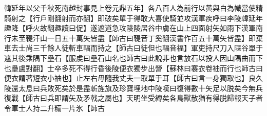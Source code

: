 韓延年以父千秋死南越封事見上卷元鼎五年】各八百人為前行以黄與白為幟當使精騎射之【行戶剛翻射而亦翻】即破矣單于得敢大喜使騎並攻漢軍疾呼曰李陵韓延年趣降【呼火故翻趣讀曰促】遂遮道急攻陵陵居谷中虜在山上四面射矢如雨下漢軍南行未至鞮汗山一日五十萬矢皆盡【師古曰鞮音丁奚翻漢書作百五十萬矢皆盡】即棄車去士尚三千餘人徒斬車輻而持之【師古曰徒但也輻音福】軍吏持尺刀入陿谷單于遮其後乘隅下壘石【服䖍曰壘石山名也師古曰此說非也言放石以投人因山隅曲而下也壘盧對翻】士卒多死不得行昏後陵便衣獨步出營【蘇林曰褰衣卷䄂而行也師古曰便衣謂著短衣小䄂也】止左右毋隨我丈夫一取單于耳【師古曰言一身獨取也】良久陵還太息曰兵敗死矣於是盡斬旌旗及珍寶埋地中陵嘆曰復得數十矢足以脱矣今無兵復戰【師古曰兵即謂矢及矛戟之屬也】天明坐受縳矣各鳥獸散猶有得脱歸報天子者令軍士人持二升糒一片氷【師古